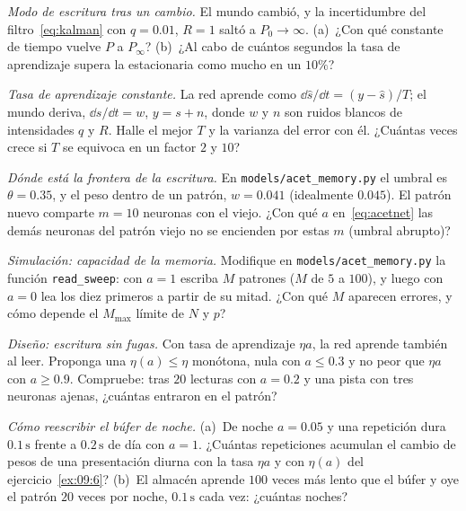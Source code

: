 \begin{exercise}[\lvlB]
\label{ex:09:2}
\emph{Modo de escritura tras un cambio.} El mundo cambió, y la incertidumbre del filtro~\eqref{eq:kalman} con $q=0.01$, $R=1$ saltó a $P_0\to\infty$. (a)~¿Con qué constante de tiempo vuelve $P$ a $P_\infty$? (b)~¿Al cabo de cuántos segundos la tasa de aprendizaje supera la estacionaria como mucho en un $10\%$?
\end{exercise}

\begin{exercise}[\lvlB]
\label{ex:09:3}
\emph{Tasa de aprendizaje constante.} La red aprende como $\dd\hat s/\dd t=(y-\hat s)/T$; el mundo deriva, $\dd s/\dd t=w$, $y=s+n$, donde $w$ y $n$ son ruidos blancos de intensidades $q$ y $R$. Halle el mejor $T$ y la varianza del error con él. ¿Cuántas veces crece si $T$ se equivoca en un factor $2$ y $10$?
\end{exercise}

\begin{exercise}[\lvlB]
\label{ex:09:4}
\emph{Dónde está la frontera de la escritura.} En \texttt{models/\allowbreak acet\_memory.py} el umbral es $\theta=0.35$, y el peso dentro de un patrón, $w=0.041$ (idealmente $0.045$). El patrón nuevo comparte $m=10$ neuronas con el viejo. ¿Con qué $a$ en~\eqref{eq:acetnet} las demás neuronas del patrón viejo no se encienden por estas $m$ (umbral abrupto)?
\end{exercise}

\begin{exercise}[\lvlB]
\label{ex:09:5}
\emph{Simulación: capacidad de la memoria.} Modifique en \texttt{models/\allowbreak acet\_memory.py} la función \texttt{read\_sweep}: con $a=1$ escriba $M$ patrones ($M$ de $5$ a $100$), y luego con $a=0$ lea los diez primeros a partir de su mitad. ¿Con qué $M$ aparecen errores, y cómo depende el $M_{\max}$ límite de $N$ y $p$?
\end{exercise}

\begin{exercise}[\lvlB]
\label{ex:09:6}
\emph{Diseño: escritura sin fugas.} Con tasa de aprendizaje $\eta a$, la red aprende también al leer. Proponga una $\eta(a)\le\eta$ monótona, nula con $a\le0.3$ y no peor que $\eta a$ con $a\ge0.9$. Compruebe: tras $20$ lecturas con $a=0.2$ y una pista con tres neuronas ajenas, ¿cuántas entraron en el patrón?
\end{exercise}

\begin{exercise}[\lvlC]
\label{ex:09:7}
\emph{Cómo reescribir el búfer de noche.} (a)~De noche $a=0.05$ y una repetición dura $0.1\,\text{s}$ frente a $0.2\,\text{s}$ de día con $a=1$. ¿Cuántas repeticiones acumulan el cambio de pesos de una presentación diurna con la tasa $\eta a$ y con $\eta(a)$ del ejercicio~\ref{ex:09:6}? (b)~El almacén aprende $100$ veces más lento que el búfer y oye el patrón $20$ veces por noche, $0.1\,\text{s}$ cada vez: ¿cuántas noches?
\end{exercise}
